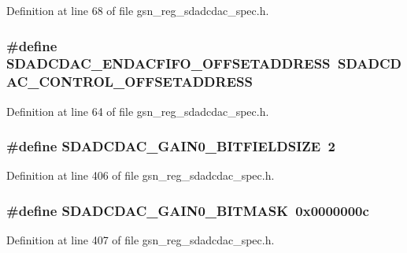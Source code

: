 Definition at line 68 of file gsn\_\-reg\_\-sdadcdac\_\-spec.h.

\hypertarget{a00569_aaa1fa56a6fac81d1598fb5860753ac39}{
\subsubsection[{SDADCDAC\_\-ENDACFIFO\_\-OFFSETADDRESS}]{\setlength{\rightskip}{0pt plus 5cm}\#define SDADCDAC\_\-ENDACFIFO\_\-OFFSETADDRESS~SDADCDAC\_\-CONTROL\_\-OFFSETADDRESS}}
\label{a00569_aaa1fa56a6fac81d1598fb5860753ac39}


Definition at line 64 of file gsn\_\-reg\_\-sdadcdac\_\-spec.h.

\hypertarget{a00569_ab248539b9bdf3520db81dda1741eb4e6}{
\subsubsection[{SDADCDAC\_\-GAIN0\_\-BITFIELDSIZE}]{\setlength{\rightskip}{0pt plus 5cm}\#define SDADCDAC\_\-GAIN0\_\-BITFIELDSIZE~2}}
\label{a00569_ab248539b9bdf3520db81dda1741eb4e6}


Definition at line 406 of file gsn\_\-reg\_\-sdadcdac\_\-spec.h.

\hypertarget{a00569_afc94f5159f4c721280e5cebd4589e7b7}{
\subsubsection[{SDADCDAC\_\-GAIN0\_\-BITMASK}]{\setlength{\rightskip}{0pt plus 5cm}\#define SDADCDAC\_\-GAIN0\_\-BITMASK~0x0000000c}}
\label{a00569_afc94f5159f4c721280e5cebd4589e7b7}


Definition at line 407 of file gsn\_\-reg\_\-sdadcdac\_\-spec.h.

